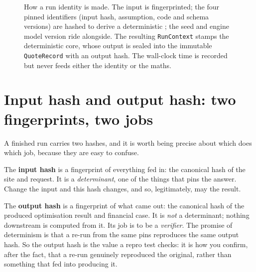 \begin{figure}[H]
{}
\caption{How a run identity is made. The input is fingerprinted; the four pinned identifiers (input hash, assumption, code and schema versions) are hashed to derive a deterministic ; the seed and engine model version ride alongside. The resulting \texttt{RunContext} stamps the deterministic core, whose output is sealed into the immutable \texttt{QuoteRecord} with an output hash. The wall-clock time is recorded but never feeds either the identity or the maths.}
\label{fig:provenance-identity}
\end{figure}

\section{Input hash and output hash: two fingerprints, two jobs}

A finished run carries two hashes, and it is worth being precise about which does which job, because they are easy to confuse.

The \textbf{input hash} is a fingerprint of everything fed in: the canonical hash of the site and request. It is a \emph{determinant}, one of the things that pins the answer. Change the input and this hash changes, and so, legitimately, may the result.

The \textbf{output hash} is a fingerprint of what came out: the canonical hash of the produced optimisation result and financial case. It is \emph{not} a determinant; nothing downstream is computed from it. Its job is to be a \emph{verifier}. The promise of determinism is that a re-run from the same pins reproduces the same output hash. So the output hash is the value a repro test checks: it is how you confirm, after the fact, that a re-run genuinely reproduced the original, rather than something that fed into producing it.

